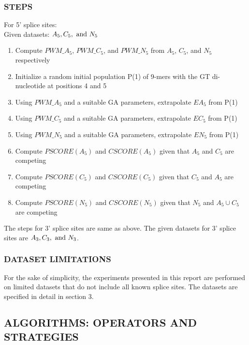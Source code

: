 \documentclass[12pt,a4paper]{article}
\begin{document}
	\subsubsection{STEPS}
	For 5' splice sites:\\
	Given datasets: $A_5, C_5,\textnormal{ and }N_5$
	\begin{enumerate}
		\item Compute $PWM\_A_5$, $PWM\_C_5$, and $PWM\_N_5$ from $A_5$, $C_5$, and $N_5$ respectively
		\item Initialize a random initial population P(1) of 9-mers with the GT di-nucleotide at positions 4 and 5
		\item Using $PWM\_A_5$ and a suitable GA parameters, extrapolate $EA_5$ from P(1)
		\item Using $PWM\_C_5$ and a suitable GA parameters, extrapolate $EC_5$ from P(1)
		\item Using $PWM\_N_5$ and a suitable GA parameters, extrapolate $EN_5$ from P(1)
		\item Compute $PSCORE(A_5)$ and $CSCORE(A_5)$ given that $A_5$ and $C_5$ are competing
		\item Compute $PSCORE(C_5)$ and $CSCORE(C_5)$ given that $C_5$ and $A_5$ are competing
		\item Compute $PSCORE(N_5)$ and $CSCORE(N_5)$ given that $N_5$ and $A_5 \cup C_5$ are competing
	\end{enumerate}
	
	The steps for 3' splice sites are same as above. The given datasets for 3' splice sites are $A_3, C_3,\textnormal{ and }N_3$.
	
	\subsubsection{DATASET LIMITATIONS}
	For the sake of simplicity, the experiments presented in this report are performed on limited datasets that do not include all known splice sites. The datasets are specified in detail in section 3.
	
	\subsection{ALGORITHMS: OPERATORS AND STRATEGIES}
\end{document}
